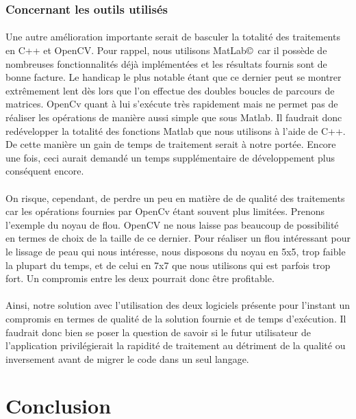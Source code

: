 \documentclass[11pt, french,screen]{report-rd-info}
\begin{document}
\subsubsection{Concernant les outils utilisés}
\paragraph*{}
Une autre amélioration importante serait de basculer la totalité des traitements en C++ et OpenCV. Pour rappel, nous utilisons MatLab\copyright~car il possède de nombreuses fonctionnalités déjà implémentées et les résultats fournis sont de bonne facture. Le handicap le plus notable étant que ce dernier peut se montrer extrêmement lent dès lors que l'on effectue des doubles boucles de parcours de matrices. OpenCv quant à lui s’exécute très rapidement mais ne permet pas de réaliser les opérations de manière aussi simple que sous Matlab. Il faudrait donc redévelopper la totalité des fonctions Matlab que nous utilisons à l’aide de C++. De cette manière un gain de temps de traitement serait à notre portée. Encore une fois, ceci aurait demandé un temps supplémentaire de développement plus conséquent encore.
\paragraph*{}
On risque, cependant, de perdre un peu en matière de de qualité des traitements car les opérations fournies par OpenCv étant souvent plus limitées. Prenons l’exemple du noyau de flou. OpenCV ne nous laisse pas beaucoup de possibilité en termes de choix de la taille de ce dernier. Pour réaliser un flou intéressant pour le lissage de peau qui nous intéresse, nous disposons du noyau en 5x5, trop faible la plupart du temps, et de celui en 7x7 que nous utilisons qui est parfois trop fort. Un compromis entre les deux pourrait donc être profitable. 
\paragraph*{}
Ainsi, notre solution avec l’utilisation des deux logiciels présente pour l’instant un compromis en termes de qualité de la solution fournie et de temps d’exécution.  Il faudrait donc bien se poser la question de savoir si le futur utilisateur de l’application privilégierait la rapidité de traitement au détriment de la qualité ou inversement avant de migrer le code dans un seul langage.


\section{Conclusion}
\end{document}
